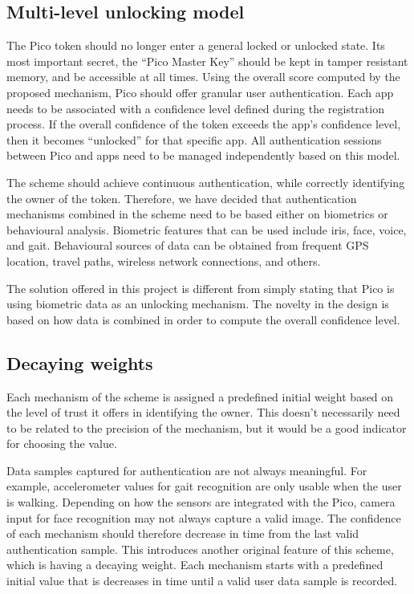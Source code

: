 \subsection*{Multi-level unlocking model}
The Pico token should no longer enter a general locked or unlocked state. Its most important secret, the ``Pico Master Key'' should be kept in tamper resistant memory, and be accessible at all times. Using the overall score computed by the proposed mechanism, Pico should offer granular user authentication. Each app needs to be associated with a confidence level defined during the registration process. If the overall confidence of the token exceeds the app's confidence level, then it becomes ``unlocked'' for that specific app. All authentication sessions between Pico and apps need to be managed independently based on this model.

The scheme should achieve continuous authentication, while correctly identifying the owner of the token. Therefore, we have decided that authentication mechanisms combined in the scheme need to be based either on biometrics or behavioural analysis. Biometric features that can be used include iris, face, voice, and gait. Behavioural sources of data can be obtained from frequent GPS location, travel paths, wireless network connections, and others.

The solution offered in this project is different from simply stating that Pico is using biometric data as an unlocking mechanism. The novelty in the design is based on how data is combined in order to compute the overall confidence level. 

\subsection*{Decaying weights}
Each mechanism of the scheme is assigned a predefined initial weight based on the level of trust it offers in identifying the owner. This doesn't necessarily need to be related to the precision of the mechanism, but it would be a good indicator for choosing the value.

Data samples captured for authentication are not always meaningful. For example, accelerometer values for gait recognition are only usable when the user is walking. Depending on how the sensors are integrated with the Pico, camera input for face recognition may not always capture a valid image. The confidence of each mechanism should therefore decrease in time from the last valid authentication sample. This introduces another original feature of this scheme, which is having a decaying weight. Each mechanism starts with a predefined initial value that is decreases in time until a valid user data sample is recorded. 


